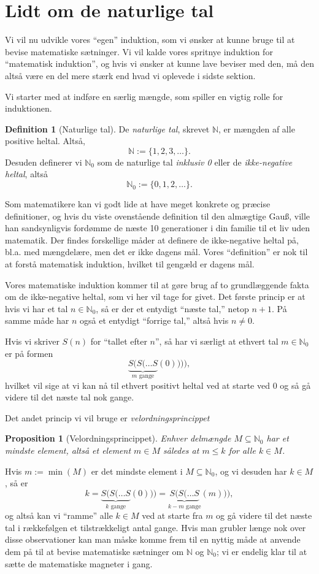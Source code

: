 \documentclass[a4paper, 12pt]{article}
\numberwithin{equation}{section}
\theoremstyle{plain}
\newtheorem{proposition}[saetning]{Proposition}
\theoremstyle{definition}
\newtheorem{definition}[saetning]{Definition}
\newcommand{\N}{\mathbb{N}}
\begin{document}
\section{Lidt om de naturlige tal}
Vi vil nu udvikle vores ``egen'' induktion, som vi ønsker at kunne bruge til at bevise matematiske sætninger. Vi vil kalde vores spritnye induktion for ``matematisk induktion'', og hvis vi ønsker at kunne lave beviser med den, må den altså være en del mere stærk end hvad vi oplevede i sidste sektion.

Vi starter med at indføre en særlig mængde, som spiller en vigtig rolle for induktionen.
\begin{definition}[Naturlige tal]
  De \emph{naturlige tal}, skrevet \(\N\), er mængden af alle positive heltal. Altså,
  \[
    \N:=\{1,2,3,\ldots\}.
  \]
  Desuden definerer vi \(\N_0\) som de naturlige tal \emph{inklusiv 0} eller de \emph{ikke-negative heltal}, altså
  \[
    \N_0:=\{0,1,2,\ldots\}.
    \]
\end{definition}
Som matematikere kan vi godt lide at have meget konkrete og præcise definitioner, og hvis du viste ovenstående definition til den almægtige Gau{\ss}, ville han sandsynligvis fordømme de næste 10 generationer i din familie til et liv uden matematik. Der findes forskellige måder at definere de ikke-negative heltal på, bl.a. med mængdelære, men det er ikke dagens mål. Vores ``definition'' er nok til at forstå matematisk induktion, hvilket til gengæld er dagens mål.

Vores matematiske induktion kommer til at gøre brug af to grundlæggende fakta om de ikke-negative heltal, som vi her vil tage for givet. Det første princip er at hvis vi har et  tal \(n\in\N_0\), så er der et entydigt ``næste tal,'' netop \(n+1\). På samme måde har \(n\) også et entydigt ``forrige tal,'' altså hvis \(n\neq 0\).

Hvis vi skriver \(S(n)\) for ``tallet efter \(n\)'', så har vi særligt at ethvert tal \(m\in\N_0\) er på formen
\[
  \underbrace{S(S(\ldots S}_{m\text{ gange}}(0)))),
\]
hvilket vil sige at vi kan nå til ethvert positivt heltal ved at starte ved 0 og så gå videre til det næste tal nok gange.

Det andet princip vi vil bruge er \emph{velordningsprincippet}
\begin{proposition}[Velordningsprincippet]
  Enhver delmængde \(M\subseteq \N_0\) har et \emph{mindste element}, altså et element \(m\in M\) således at \(m\le k\) for alle \(k\in M\).
\end{proposition}
Hvis \(m:=\min(M)\) er det mindste element i \(M\subseteq \N_0\), og vi desuden har \(k\in M\), så er
\[
  k=\underbrace{S(S(\ldots S}_{k\text{ gange}}(0)))=\underbrace{S(S(\ldots S}_{k-m\text{ gange}}(m))),
  \]
  og altså kan vi ``ramme'' alle \(k\in M\) ved at starte fra \(m\) og gå videre til det næste tal i rækkefølgen et tilstrækkeligt antal gange. Hvis man grubler længe nok over disse observationer kan man måske komme frem til en nyttig måde at anvende dem på til at bevise matematiske sætninger om \(\N\) og \(\N_0\); vi er endelig klar til at sætte de matematiske magneter i gang.
\end{document}
